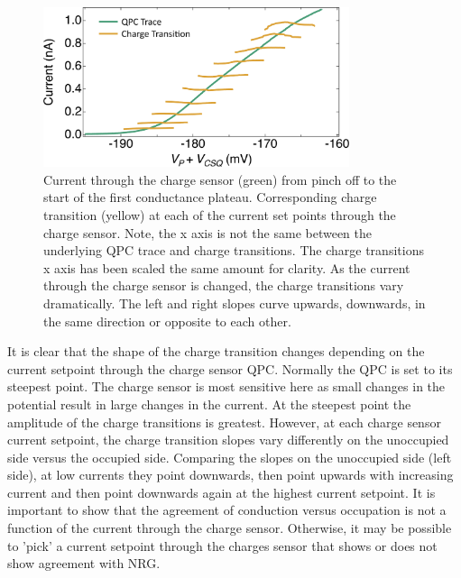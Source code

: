 \begin{figure}[!bht]
  \begin{center}
    \includegraphics[width=0.8\textwidth]{figures/ch3/crop_FiguresMaster.016.png}
    \caption[Charge transitions measured at various current set points through the charge sensor]{\label{fig:ch3/cond_occ_ct_set-points} 
    Current through the charge sensor (green) from pinch off to the start of the first conductance plateau. Corresponding charge transition (yellow) at each of the current set points through the charge sensor. Note, the x axis is not the same between the underlying QPC trace and charge transitions. The charge transitions x axis has been scaled the same amount for clarity. As the current through the charge sensor is changed, the charge transitions vary dramatically. The left and right slopes curve upwards, downwards, in the same direction or opposite to each other.}
  \end{center}
\end{figure}
\FloatBarrier

It is clear that the shape of the charge transition changes depending on the current setpoint through the charge sensor QPC. Normally the QPC is set to its steepest point. The charge sensor is most sensitive here as small changes in the potential result in large changes in the current. At the steepest point the amplitude of the charge transitions is greatest. However, at each charge sensor current setpoint, the charge transition slopes vary differently on the unoccupied side versus the occupied side. Comparing the slopes on the unoccupied side (left side), at low currents they point downwards, then point upwards with increasing current and then point downwards again at the highest current setpoint. It is important to show that the agreement of conduction versus occupation is not a function of the current through the charge sensor. Otherwise, it may be possible to 'pick' a current setpoint through the charges sensor that shows or does not show agreement with NRG. 

